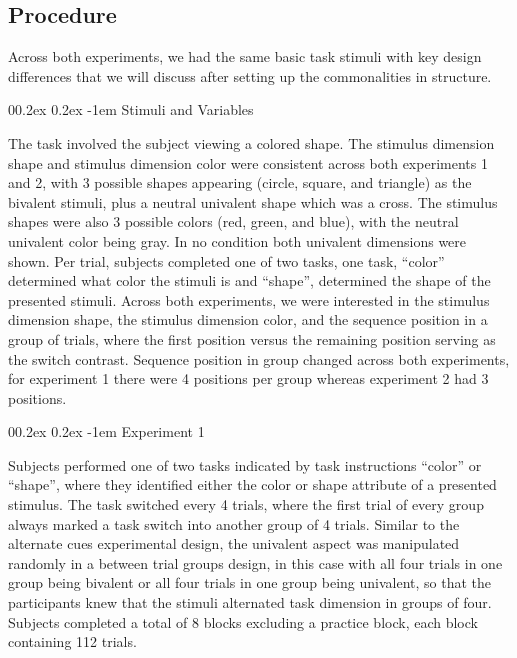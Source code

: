 \documentclass[
  english,
  man,floatsintext]{apa6}
\makeatletter
\let\oldparagraph\paragraph
\renewcommand{\paragraph}{
    \@ifstar
      \xxxParagraphStar
      \xxxParagraphNoStar
  }
\newcommand{\xxxParagraphStar}[1]{\oldparagraph*{#1}\mbox{}}
\newcommand{\xxxParagraphNoStar}[1]{\oldparagraph{#1}\mbox{}}
\renewcommand{\paragraph}{\@startsection{paragraph}{4}{\parindent}%
  {0\baselineskip \@plus 0.2ex \@minus 0.2ex}%
  {-1em}%
  {\normalfont\normalsize\bfseries\itshape\typesectitle}}
\makeatother
\begin{document}
\subsection{Procedure}\label{procedure}

Across both experiments, we had the same basic task stimuli with key design differences that we will discuss after setting up the commonalities in structure.

\paragraph{Stimuli and Variables}\label{stimuli-and-variables}

The task involved the subject viewing a colored shape. The stimulus dimension shape and stimulus dimension color were consistent across both experiments 1 and 2, with 3 possible shapes appearing (circle, square, and triangle) as the bivalent stimuli, plus a neutral univalent shape which was a cross. The stimulus shapes were also 3 possible colors (red, green, and blue), with the neutral univalent color being gray. In no condition both univalent dimensions were shown. Per trial, subjects completed one of two tasks, one task, ``color'' determined what color the stimuli is and ``shape'', determined the shape of the presented stimuli.
Across both experiments, we were interested in the stimulus dimension shape, the stimulus dimension color, and the sequence position in a group of trials, where the first position versus the remaining position serving as the switch contrast. Sequence position in group changed across both experiments, for experiment 1 there were 4 positions per group whereas experiment 2 had 3 positions.

\paragraph{Experiment 1}\label{experiment-1}

Subjects performed one of two tasks indicated by task instructions ``color'' or ``shape'', where they identified either the color or shape attribute of a presented stimulus. The task switched every 4 trials, where the first trial of every group always marked a task switch into another group of 4 trials. Similar to the alternate cues experimental design, the univalent aspect was manipulated randomly in a between trial groups design, in this case with all four trials in one group being bivalent or all four trials in one group being univalent, so that the participants knew that the stimuli alternated task dimension in groups of four. Subjects completed a total of 8 blocks excluding a practice block, each block containing 112 trials.
\end{document}
